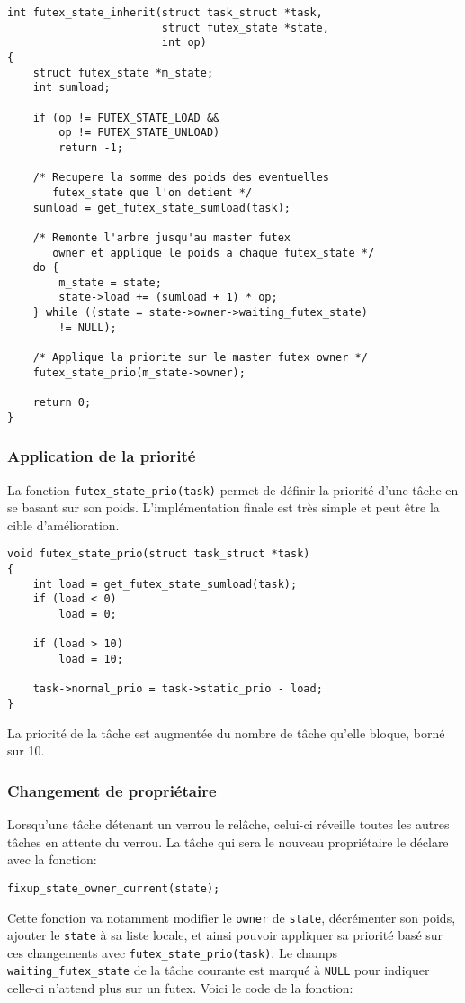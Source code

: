 \begin{lstlisting}[tabsize=4]
int futex_state_inherit(struct task_struct *task, 
						struct futex_state *state,
						int op)
{
	struct futex_state *m_state;
	int sumload;
	
	if (op != FUTEX_STATE_LOAD && 
		op != FUTEX_STATE_UNLOAD)
		return -1;
	
	/* Recupere la somme des poids des eventuelles 
 	   futex_state que l'on detient */
	sumload = get_futex_state_sumload(task);
	
	/* Remonte l'arbre jusqu'au master futex 
 	   owner et applique le poids a chaque futex_state */
	do {
		m_state = state;
		state->load += (sumload + 1) * op;
	} while ((state = state->owner->waiting_futex_state)
		!= NULL);
	
	/* Applique la priorite sur le master futex owner */
	futex_state_prio(m_state->owner);
	
	return 0;
}
\end{lstlisting}

\subsubsection{Application de la priorité}

La fonction \verb|futex_state_prio(task)| permet de définir la priorité d'une tâche en se
basant sur son poids. L'implémentation finale est très simple et peut être la cible
d'amélioration.
\begin{lstlisting}[tabsize=4]
void futex_state_prio(struct task_struct *task)
{
	int load = get_futex_state_sumload(task);
	if (load < 0)
		load = 0;
	
	if (load > 10)
		load = 10;
	
	task->normal_prio = task->static_prio - load;
}
\end{lstlisting}

La priorité de la tâche est augmentée du nombre de tâche qu'elle bloque, borné sur 10.

\subsubsection{Changement de propriétaire}

Lorsqu'une tâche détenant un verrou le relâche, celui-ci réveille toutes les autres tâches en attente
du verrou. La tâche qui sera le nouveau propriétaire le déclare avec la fonction:
\begin{lstlisting}[tabsize=4]
	fixup_state_owner_current(state);
\end{lstlisting}
Cette fonction va notamment modifier le \verb|owner| de \verb|state|, décrémenter son poids, ajouter 
le \verb|state| à sa liste locale, et ainsi pouvoir appliquer sa priorité basé sur ces changements avec
\verb|futex_state_prio(task)|. Le champs \verb|waiting_futex_state| de la tâche courante est marqué à \verb|NULL|
pour indiquer celle-ci n'attend plus sur un futex. Voici le code de la fonction:

